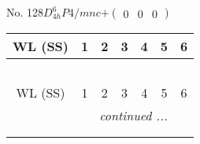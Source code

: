 \documentclass[fleqn,9pt,landscape]{jsarticle}
\begin{document}
\newpage
No. 128\quad$D_{4h}^{6}$\quad$P4/mnc$\quad[ tetragonal ]\quad$+\begin{pmatrix} 0 & 0 & 0 \end{pmatrix}$
\begin{center}
\renewcommand{\arraystretch}{1.2}
\begin{longtable}{ccccccc}
 \hline \hline
WL (SS) & 1 & 2 & 3 & 4 & 5 & 6 \\ \hline \endfirsthead

\multicolumn{6}{l}{\tablename\ \thetable{}} \\
 \hline \hline
WL (SS) & 1 & 2 & 3 & 4 & 5 & 6 \\ \hline \endhead

 \hline \hline
\multicolumn{6}{r}{\footnotesize\it continued ...} \\ \endfoot

 \hline \hline
\multicolumn{6}{r}{} \\ \endlastfoot


\end{longtable}
\end{center}
\end{document}
